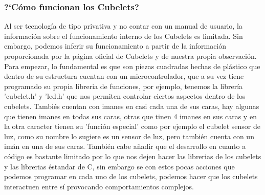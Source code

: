 \subsubsection{?`C\'omo funcionan los Cubelets?}
\label{subsubsection:comofuncionan}
    Al ser tecnolog\'ia de tipo privativa y no contar con un manual de usuario, la informaci\'on
        sobre el funcionamiento interno de los Cubelets es limitada. Sin embargo, podemos
        inferir su funcionamiento a partir de la informaci\'on proporcionada por la p\'agina
        oficial de Cubelets\cite{modrobotics2023} y de nuestra propia observaci\'on.
    \vskip 0.5cm
    Para empezar, lo fundamental es que son piezas cuadradas hechas de pl\'astico que 
        dentro de su estructura cuentan con un microcontrolador, que a su vez tiene 
        programado su propia libreria de funciones, por ejemplo, tenemos la librer\'ia 
        'cubelet.h' y 'led.h' que nos permiten controlar ciertos aspectos dentro de los cubelets.\cite{modrobotics2012}
    \vskip 0.5cm
    Tambi\'es cuentan con imanes en casi cada una de sus caras, hay algunas que tienen 
        imanes en todas sus caras, otras que tinen 4 imanes en sus caras y en la otra caracter
        tienen su 'funci\'on especial' como por ejemplo el cubelet sensor de luz, como su nombre lo 
        sugiere es un sensor de luz, pero tambi\'en cuenta con un im\'an en una de sus caras.
    \vskip 0.5cm
    Tambi\'en cabe a\~nadir que el desarrollo en cuanto a c\'odigo es bastante limitado por lo que 
        nos dejen hacer las librerias de los cubelets y las librerias \'estandar de C, sin embargo 
        se con estos pocas acciones que podemos programar en cada uno de los cubelets, podemos
        hacer que los cubelets interactuen entre s\'i provocando comportamientos complejos.